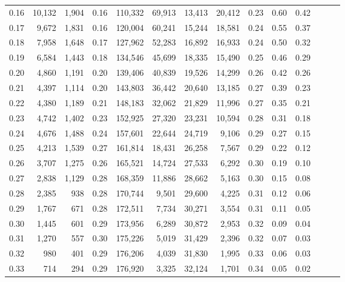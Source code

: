\begin{tabular}{rrrrrrrrrrrrrr}
0.16 &  10,132 &  1,904 &  0.16 &  110,332 &   69,913 &  13,413 &  20,412 &  0.23 &  0.60 &      0.42 \\
0.17 &   9,672 &  1,831 &  0.16 &  120,004 &   60,241 &  15,244 &  18,581 &  0.24 &  0.55 &      0.37 \\
0.18 &   7,958 &  1,648 &  0.17 &  127,962 &   52,283 &  16,892 &  16,933 &  0.24 &  0.50 &      0.32 \\
0.19 &   6,584 &  1,443 &  0.18 &  134,546 &   45,699 &  18,335 &  15,490 &  0.25 &  0.46 &      0.29 \\
0.20 &   4,860 &  1,191 &  0.20 &  139,406 &   40,839 &  19,526 &  14,299 &  0.26 &  0.42 &      0.26 \\
0.21 &   4,397 &  1,114 &  0.20 &  143,803 &   36,442 &  20,640 &  13,185 &  0.27 &  0.39 &      0.23 \\
0.22 &   4,380 &  1,189 &  0.21 &  148,183 &   32,062 &  21,829 &  11,996 &  0.27 &  0.35 &      0.21 \\
0.23 &   4,742 &  1,402 &  0.23 &  152,925 &   27,320 &  23,231 &  10,594 &  0.28 &  0.31 &      0.18 \\
0.24 &   4,676 &  1,488 &  0.24 &  157,601 &   22,644 &  24,719 &   9,106 &  0.29 &  0.27 &      0.15 \\
0.25 &   4,213 &  1,539 &  0.27 &  161,814 &   18,431 &  26,258 &   7,567 &  0.29 &  0.22 &      0.12 \\
0.26 &   3,707 &  1,275 &  0.26 &  165,521 &   14,724 &  27,533 &   6,292 &  0.30 &  0.19 &      0.10 \\
0.27 &   2,838 &  1,129 &  0.28 &  168,359 &   11,886 &  28,662 &   5,163 &  0.30 &  0.15 &      0.08 \\
0.28 &   2,385 &    938 &  0.28 &  170,744 &    9,501 &  29,600 &   4,225 &  0.31 &  0.12 &      0.06 \\
0.29 &   1,767 &    671 &  0.28 &  172,511 &    7,734 &  30,271 &   3,554 &  0.31 &  0.11 &      0.05 \\
0.30 &   1,445 &    601 &  0.29 &  173,956 &    6,289 &  30,872 &   2,953 &  0.32 &  0.09 &      0.04 \\
0.31 &   1,270 &    557 &  0.30 &  175,226 &    5,019 &  31,429 &   2,396 &  0.32 &  0.07 &      0.03 \\
0.32 &     980 &    401 &  0.29 &  176,206 &    4,039 &  31,830 &   1,995 &  0.33 &  0.06 &      0.03 \\
0.33 &     714 &    294 &  0.29 &  176,920 &    3,325 &  32,124 &   1,701 &  0.34 &  0.05 &      0.02 \\

\end{tabular}
